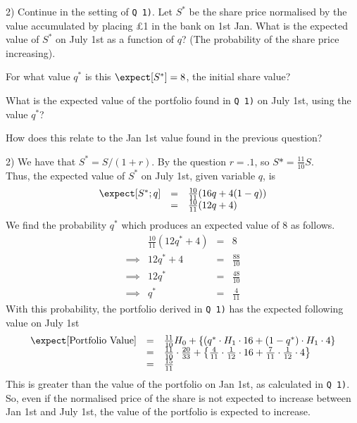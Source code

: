 \documentclass[11pt,a4paper]{article}
\begin{document}
\begin{question}{2)}
  Continue in the setting of \texttt{Q 1)}. Let $S^*$ be the share price normalised by the value accumulated by placing £1 in the bank on 1st Jan. What is the expected value of $S^*$ on July 1st as a function of $q$? (The probability of the share price increasing).
  \par For what value $q^*$ is this $\expect[S^*]=8$, the initial share value?
  \par What is the expected value of the portfolio found in \texttt{Q 1)} on July 1st, using the value $q^*$?
  \par How does this relate to the Jan 1st value found in the previous question?
\end{question}

\begin{answer}{2)}
  We have that $S^*=S/(1+r)$. By the question $r=.1$, so $S*=\frac{11}{10}S$.\\
  Thus, the expected value of $S^*$ on July 1st, given variable $q$, is
  \[\begin{array}{rcl}
    \expect[S^*;q]&=&\frac{10}{11}(16q+4(1-q))\\
    &=&\frac{10}{11}(12q+4)
  \end{array}\]
  We find the probability $q^*$ which produces an expected value of 8 as follows.
  \[\begin{array}{rrcl}
    &\frac{10}{11}(12q^*+4)&=&8\\
    \implies&12q^*+4&=&\frac{88}{10}\\
    \implies&12q^*&=&\frac{48}{10}\\
    \implies&q^*&=&\frac{4}{11}
  \end{array}\]
  With this probability, the portfolio derived in \texttt{Q 1)} has the expected following value on July 1st
  \[\begin{array}{rcl}
    \expect[\text{Portfolio Value}]&=&\frac{11}{10}H_0+\left\{(q^*\cdot H_1\cdot 16+(1-q^*)\cdot H_1\cdot4\right\}\\
    &=&\frac{11}{10}\cdot\frac{20}{33}+\left\{\frac4{11}\cdot\frac1{12}\cdot16+\frac{7}{11}\cdot\frac1{12}\cdot4\right\}\\
    &=&\frac{15}{11}
  \end{array}\]
  This is greater than the value of the portfolio on Jan 1st, as calculated in \texttt{Q 1)}. So, even if the normalised price of the share is not expected to increase between Jan 1st and July 1st, the value of the portfolio is expected to increase.
\end{answer}
\end{document}
